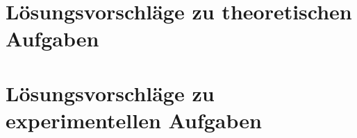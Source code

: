 \documentclass[12pt,a4paper]{article}
\newcounter{numlabel}
\newenvironment{problem}[2]{\stepcounter{numlabel} \vspace{1ex} \subsubsection*{Aufgabe \the\value{numlabel}: #1 \emph{(#2 Punkte)}} \renewcommand{\Currentlabel}{Aufgabe \the\value{numlabel}: #1}}{

}
\begin{document}
% 
% 






\section*{Lösungsvorschläge zu theoretischen Aufgaben}


\section*{Lösungsvorschläge zu experimentellen Aufgaben}
\end{document}
